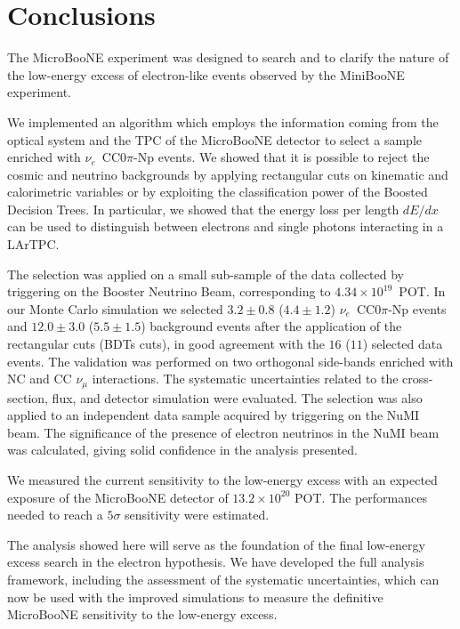 \chapter{Conclusions}\label{ch:7-conclusions}
The MicroBooNE experiment was designed to search and to clarify the nature of the low-energy excess of electron-like events observed by the MiniBooNE experiment. 

We implemented an algorithm which employs the information coming from the optical system and the TPC of the MicroBooNE detector to select a sample enriched with $\nu_e$~CC0$\pi$-Np events. We showed that it is possible to reject the cosmic and neutrino backgrounds by applying rectangular cuts on kinematic and calorimetric variables or by exploiting the classification power of the Boosted Decision Trees. In particular, we showed that the energy loss per length $dE/dx$ can be used to distinguish between electrons and single photons interacting in a LArTPC. 

The selection was applied on a small sub-sample of the data collected by triggering on the Booster Neutrino Beam, corresponding to $4.34\times10^{19}$~POT. In our Monte Carlo simulation we selected $3.2\pm0.8$ ($4.4\pm1.2$) $\nu_e$~CC0$\pi$-Np events and $12.0\pm3.0$ ($5.5\pm1.5$) background events after the application of the rectangular cuts (BDTs cuts), in good agreement with the $16$ ($11$) selected data events. The validation was performed on two orthogonal side-bands enriched with NC and CC $\nu_{\mu}$ interactions. The systematic uncertainties related to the cross-section, flux, and detector simulation were evaluated. The selection was also applied to an independent data sample acquired by triggering on the NuMI beam. The significance of the presence of electron neutrinos in the NuMI beam was calculated, giving solid confidence in the analysis presented. 

We measured the current sensitivity to the low-energy excess with an expected exposure of the MicroBooNE detector of $13.2\times10^{20}$ POT. The performances needed to reach a $5\sigma$ sensitivity were estimated.

The analysis showed here will serve as the foundation of the final low-energy excess search in the electron hypothesis. We have developed the full analysis framework, including the assessment of the systematic uncertainties, which can now be used with the improved simulations to measure the definitive MicroBooNE sensitivity to the low-energy excess. 

